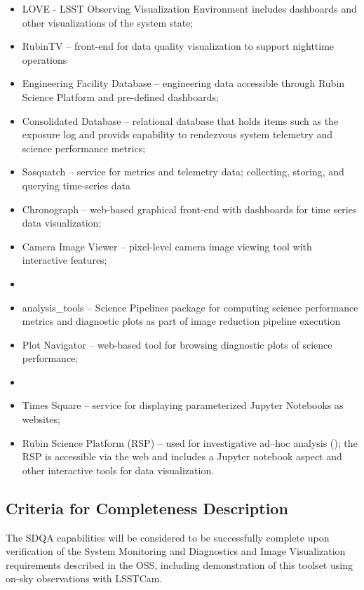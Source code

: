 \begin{itemize}

	\item LOVE - LSST Observing Visualization Environment includes dashboards and other visualizations of the system state;
	\item RubinTV -- front-end for data quality visualization to support nighttime operations
	\item Engineering Facility Database -- engineering data accessible through Rubin Science Platform and pre-defined dashboards;
	\item Consolidated Database -- relational database that holds items such as the exposure log and provids capability to rendezvous system telemetry and science performance metrics;
	\item Sasquatch -- service for metrics and telemetry data; collecting, storing, and querying time-series data
	\item Chronograph -- web-based graphical front-end with dashboards for time series data visualization;
	\item Camera Image Viewer -- pixel-level camera image viewing tool with interactive features;
	\item \item analysis\_tools -- Science Pipelines package for computing science performance metrics and diagnostic plots as part of image reduction pipeline execution
	\item Plot Navigator -- web-based tool for browsing diagnostic plots of science performance;
	\item \item Times Square -- service for displaying parameterized Jupyter Notebooks as websites;
	\item Rubin Science Platform (RSP) -- used for investigative ad--hoc analysis (); the RSP is accessible via the web and includes a Jupyter notebook aspect and other interactive tools for data visualization.

\end{itemize}

\subsection{Criteria for Completeness Description}

The SDQA capabilities will be considered to be successfully complete upon verification of the System Monitoring and Diagnostics and Image Visualization requirements described in the OSS, including demonstration of this toolset using on-sky observations with LSSTCam.


